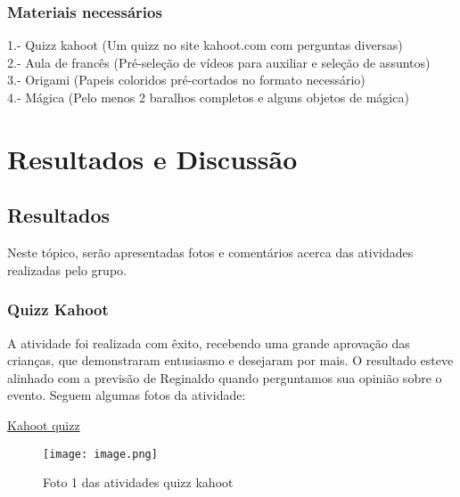 \documentclass[a4paper,12pt]{article}
\begin{document}
\subsubsection{Materiais necessários}\vspace{0.3cm}
1.- Quizz kahoot (Um quizz no site kahoot.com com perguntas diversas)\\
2.- Aula de francês (Pré-seleção de vídeos para auxiliar e seleção de assuntos)\\
3.- Origami (Papeis coloridos pré-cortados no formato necessário)\\
4.- Mágica (Pelo menos 2 baralhos completos e alguns objetos de mágica)\vspace{0.2cm}\\

\section{\LARGE{Resultados e Discussão}}
\vspace{0.5cm}

\subsection{\Large{Resultados}}
\vspace{0.2cm}
Neste tópico, serão apresentadas fotos e comentários acerca das atividades realizadas pelo grupo.

\subsubsection{Quizz Kahoot}
A atividade foi realizada com êxito, recebendo uma grande aprovação das crianças, que demonstraram entusiasmo e desejaram por mais. O resultado esteve alinhado com a previsão de Reginaldo quando perguntamos sua opinião sobre o evento. Seguem algumas fotos da atividade:

\vspace{1cm}


\href{https://play.kahoot.it/v2/?quizId=28a22c69-5679-45eb-b411-e55ef0a63311}{Kahoot quizz}\\

\begin{figure}[h]
    \centering
    \texttt{[image: image.png]}
    \caption{Foto 1 das atividades quizz kahoot}
    \label{fig:foto1505}
\end{figure}

\vspace{1cm}
\end{document}

